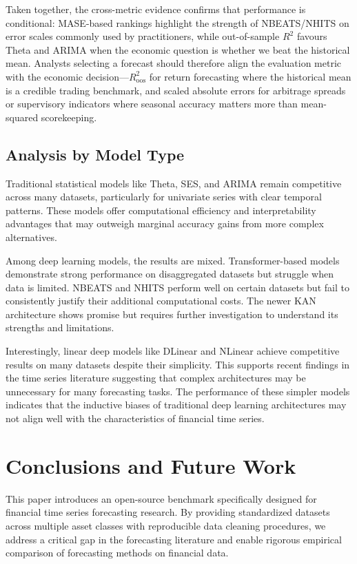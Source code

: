 \documentclass{article}
\begin{document}
Taken together, the cross-metric evidence confirms that performance is conditional: MASE-based rankings highlight the strength of NBEATS/NHITS on error scales commonly used by practitioners, while out-of-sample $R^2$ favours Theta and ARIMA when the economic question is whether we beat the historical mean. Analysts selecting a forecast should therefore align the evaluation metric with the economic decision—$R^2_{\text{oos}}$ for return forecasting where the historical mean is a credible trading benchmark, and scaled absolute errors for arbitrage spreads or supervisory indicators where seasonal accuracy matters more than mean-squared scorekeeping.

\subsection{Analysis by Model Type}

Traditional statistical models like Theta, SES, and ARIMA remain competitive across many datasets, particularly for univariate series with clear temporal patterns. These models offer computational efficiency and interpretability advantages that may outweigh marginal accuracy gains from more complex alternatives.

Among deep learning models, the results are mixed. Transformer-based models demonstrate strong performance on disaggregated datasets but struggle when data is limited. NBEATS and NHITS perform well on certain datasets but fail to consistently justify their additional computational costs. The newer KAN architecture shows promise but requires further investigation to understand its strengths and limitations.

Interestingly, linear deep models like DLinear and NLinear achieve competitive results on many datasets despite their simplicity. This supports recent findings in the time series literature suggesting that complex architectures may be unnecessary for many forecasting tasks. The performance of these simpler models indicates that the inductive biases of traditional deep learning architectures may not align well with the characteristics of financial time series.

\section{Conclusions and Future Work}
\label{sec:conclusion}

This paper introduces an open-source benchmark specifically designed for financial time series forecasting research. By providing standardized datasets across multiple asset classes with reproducible data cleaning procedures, we address a critical gap in the forecasting literature and enable rigorous empirical comparison of forecasting methods on financial data.
\end{document}

